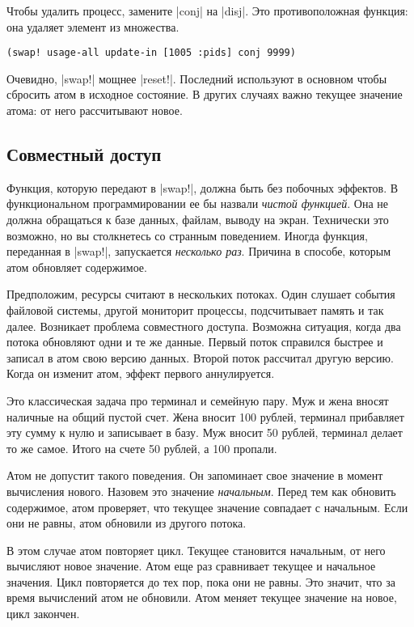 Чтобы удалить процесс, замените \spverb|conj| на \spverb|disj|. Это
противоположная функция: она удаляет элемент из множества.

\begin{verbatim}
(swap! usage-all update-in [1005 :pids] conj 9999)
\end{verbatim}

Очевидно, \spverb|swap!| мощнее \spverb|reset!|. Последний используют в основном
чтобы сбросить атом в исходное состояние. В других случаях важно текущее
значение атома: от него рассчитывают новое.

\subsection{Совместный доступ}

Функция, которую передают в \spverb|swap!|, должна быть без побочных эффектов. В
функциональном программировании ее бы назвали \emph{чистой функцией}. Она не
должна обращаться к базе данных, файлам, выводу на экран. Технически это
возможно, но вы столкнетесь со странным поведением. Иногда функция, переданная в
\spverb|swap!|, запускается \emph{несколько раз}. Причина в способе, которым
атом обновляет содержимое.

Предположим, ресурсы считают в нескольких потоках. Один слушает события файловой
системы, другой мониторит процессы, подсчитывает память и так далее. Возникает
проблема совместного доступа. Возможна ситуация, когда два потока обновляют одни
и те же данные. Первый поток справился быстрее и записал в атом свою версию
данных. Второй поток рассчитал другую версию. Когда он изменит атом, эффект
первого аннулируется.

Это классическая задача про терминал и семейную пару. Муж и жена вносят наличные
на общий пустой счет. Жена вносит 100 рублей, терминал прибавляет эту сумму к
нулю и записывает в базу. Муж вносит 50 рублей, терминал делает то же
самое. Итого на счете 50 рублей, а 100 пропали.

Атом не допустит такого поведения. Он запоминает свое значение в момент
вычисления нового. Назовем это значение \emph{начальным}. Перед тем как обновить
содержимое, атом проверяет, что текущее значение совпадает с начальным. Если они
не равны, атом обновили из другого потока.

В этом случае атом повторяет цикл. Текущее становится начальным, от него
вычисляют новое значение. Атом еще раз сравнивает текущее и начальное
значения. Цикл повторяется до тех пор, пока они не равны. Это значит, что за
время вычислений атом не обновили. Атом меняет текущее значение на новое, цикл
закончен.

